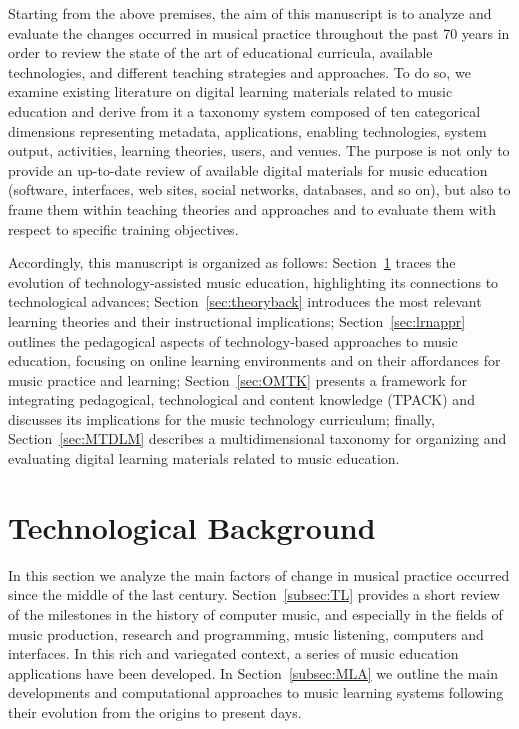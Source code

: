 \documentclass[10pt,journal,compsoc]{IEEEtran}
\begin{document}
Starting from the above premises, the aim of this manuscript is to analyze and evaluate the changes occurred in musical practice throughout the past 70 years in order to review the state of the art of educational curricula, available technologies, and different teaching strategies and approaches. To do so, we examine existing literature on digital learning materials related to music education and derive from it a taxonomy system composed of ten categorical dimensions representing metadata, applications, enabling technologies, system output, activities, learning theories, users, and venues. The purpose is not only to provide an up-to-date review of available digital materials for music education (software, interfaces, web sites, social networks, databases, and so on), but also to frame them within teaching theories and approaches and to evaluate them with respect to specific training objectives.

Accordingly, this manuscript is organized as follows: Section~\ref{sec:techback} traces the evolution of technology-assisted music education, highlighting its connections to technological advances; Section~\ref{sec:theoryback} introduces the most relevant learning theories and their instructional implications; Section~\ref{sec:lrnappr} outlines the pedagogical aspects of technology-based approaches to music education, focusing on online learning environments and on their affordances for music practice and learning; Section~\ref{sec:OMTK} presents a framework for integrating pedagogical, technological and content knowledge (TPACK) and discusses its implications for the music technology curriculum; finally, Section~\ref{sec:MTDLM} describes a multidimensional taxonomy for organizing and evaluating digital learning materials related to music education.


\section{Technological Background}
\label{sec:techback}

In this section we analyze the main factors of change in musical practice occurred since the middle of the last century. 
Section~\ref{subsec:TL} provides a short review of the milestones in the history of computer music, and especially in the fields of music production, research and programming, music listening, computers and interfaces. In this rich and variegated context, a series of music education applications have been developed. In Section~\ref{subsec:MLA} we outline the main developments and computational approaches to music learning systems following their evolution from the origins to present days.
\end{document}
